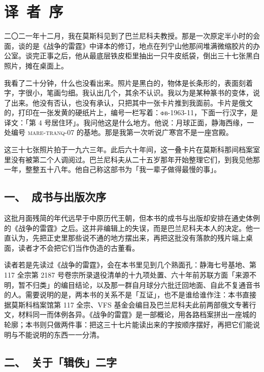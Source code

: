 
\clearpage
\chapter*{译\ 者\ 序}

二〇二一年十二月，我在莫斯科见到了巴兰尼科夫教授。那是一次原定半小时的会面，谈的是《战争的雷霆》中译本的修订，地点在列宁山他那间堆满微缩胶片的办公室。谈完正事之后，他从最底层铁皮柜里抽出一只牛皮纸袋，倒出三十七张黑白照片，摊在桌面上。

我看了二十分钟，什么也没看出来。照片是黑白的，物体是长条形的，表面刻着字，字很小，笔画匀细。我认出几个，其余不认识。我以为是某种篆书的变体，说了出来。他没有否认，也没有承认，只把其中一张卡片推到我面前。卡片是俄文的，打印在一张发黄的硬纸片上，编号一栏写着：\textsc{фв}-1963-11，下面一行汉字，是译文：「第 4 号居住环」。我问他这是什么地方。他说：月球正面，静海西缘，一处编号 \textsc{mare-tranq-07} 的基地。那是我第一次听说广寒宫不是一座宫殿。

这三十七张照片拍于一九六三年。此后六十年间，这一叠卡片在莫斯科那间档案室里没有被第二个人调阅过。巴兰尼科夫从二十五岁那年开始整理它们，到我见他那一年，整整五十八年。他自己称这部书为「我一辈子做得最慢的事」。

\section*{一、\ 成书与出版次序}

这批月面残简的年代远早于中原历代王朝，但本书的成书与出版却安排在通史体例的《战争的雷霆》之后。这并非编辑上的失误，而是巴兰尼科夫本人的决定。他一直认为，先把正史里那些说不通的地方摆出来，再把这批没有落款的残片端上桌面，读者才不会把它们当作伪造的古董看。

读者若是先读过《战争的雷霆》，会在本书里见到几个熟面孔：静海七号基地、第 117 全宗第 2187 号卷宗所录退役清单的十九项处置、六十年前苏联方面「来源不明，暂不归类」的编目结论，以及那一群自月球分六批迁回地面、自此不复通音书的人。需要说明的是，两本书的关系不是「互证」，也不是谁给谁作注：本书直接据莫斯科档案馆第 117 全宗、VFS 基金会编目及巴兰尼科夫此前两部俄文专著行文，材料同一而体例各异。《战争的雷霆》是一部概论，用各路档案拼出一座城的轮廓；本书则只做两件事：把这三十七片能读出来的字按顺序摆好，再把它们能说明与不能说明的东西一一分清。

\section*{二、\ 关于「辑佚」二字}

